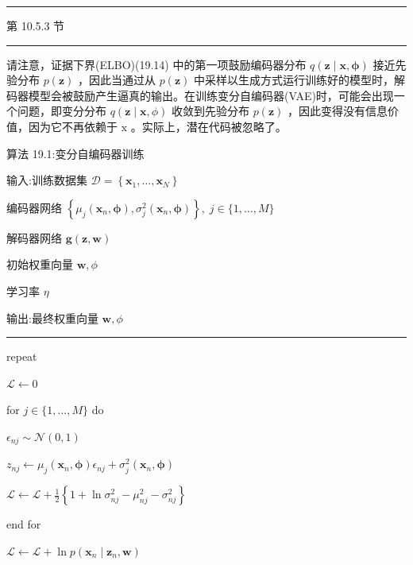 \documentclass[10pt]{article}
\newcommand{\HRule}{\begin{center}\rule{0.9\linewidth}{0.2mm}\end{center}}
\begin{document}
\HRule

第 10.5.3 节

\HRule

请注意，证据下界(ELBO)(19.14) 中的第一项鼓励编码器分布 \(q\left( {\mathbf{z} \mid  \mathbf{x},\mathbf{\phi }}\right)\) 接近先验分布 \(p\left( \mathbf{z}\right)\) ，因此当通过从 \(p\left( \mathbf{z}\right)\) 中采样以生成方式运行训练好的模型时，解码器模型会被鼓励产生逼真的输出。在训练变分自编码器(VAE)时，可能会出现一个问题，即变分分布 \(q\left( {\mathbf{z} \mid  \mathbf{x},\phi }\right)\) 收敛到先验分布 \(p\left( \mathbf{z}\right)\) ，因此变得没有信息价值，因为它不再依赖于 \(\mathrm{x}\) 。实际上，潜在代码被忽略了。

算法 19.1:变分自编码器训练

输入:训练数据集 \(\mathcal{D} = \left\{  {{\mathbf{x}}_{1},\ldots ,{\mathbf{x}}_{N}}\right\}\)

编码器网络 \(\left\{  {{\mu }_{j}\left( {{\mathbf{x}}_{n},\mathbf{\phi }}\right) ,{\sigma }_{j}^{2}\left( {{\mathbf{x}}_{n},\mathbf{\phi }}\right) }\right\}  ,\;j \in  \{ 1,\ldots ,M\}\)

解码器网络 \(\mathbf{g}\left( {\mathbf{z},\mathbf{w}}\right)\)

初始权重向量 \(\mathbf{w},\phi\)

学习率 \(\eta\)

输出:最终权重向量 \(\mathbf{w},\phi\)

\HRule

repeat

\hspace*{1em} \(\mathcal{L} \leftarrow  0\)

\hspace*{1em} for \(j \in  \{ 1,\ldots ,M\}\) do

\hspace*{2em} \({\epsilon }_{nj} \sim  \mathcal{N}\left( {0,1}\right)\)

\hspace*{2em} \({z}_{nj} \leftarrow  {\mu }_{j}\left( {{\mathbf{x}}_{n},\mathbf{\phi }}\right) {\epsilon }_{nj} + {\sigma }_{j}^{2}\left( {{\mathbf{x}}_{n},\mathbf{\phi }}\right)\)

\hspace*{2em} \(\mathcal{L} \leftarrow  \mathcal{L} + \frac{1}{2}\left\{  {1 + \ln {\sigma }_{nj}^{2} - {\mu }_{nj}^{2} - {\sigma }_{nj}^{2}}\right\}\)

\hspace*{1em} end for

\hspace*{1em} \(\mathcal{L} \leftarrow  \mathcal{L} + \ln p\left( {{\mathbf{x}}_{n} \mid  {\mathbf{z}}_{n},\mathbf{w}}\right)\)
\end{document}
